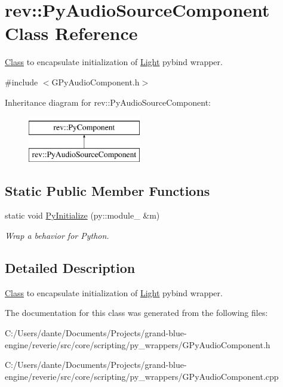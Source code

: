 \hypertarget{classrev_1_1_py_audio_source_component}{}\section{rev\+::Py\+Audio\+Source\+Component Class Reference}
\label{classrev_1_1_py_audio_source_component}


\mbox{\hyperlink{struct_class}{Class}} to encapsulate initialization of \mbox{\hyperlink{classrev_1_1_light}{Light}} pybind wrapper.  




{\ttfamily \#include $<$G\+Py\+Audio\+Component.\+h$>$}

Inheritance diagram for rev\+::Py\+Audio\+Source\+Component\+:\begin{figure}[H]
\begin{center}
\leavevmode
\includegraphics[height=2.000000cm]{classrev_1_1_py_audio_source_component}
\end{center}
\end{figure}
\subsection*{Static Public Member Functions}
\begin{DoxyCompactItemize}
\item 
\mbox{\label{classrev_1_1_py_audio_source_component_a4972bb4e03217925d9008727a3e3cdab}} 
static void \mbox{\hyperlink{classrev_1_1_py_audio_source_component_a4972bb4e03217925d9008727a3e3cdab}{Py\+Initialize}} (py\+::module\+\_\+ \&m)
\begin{DoxyCompactList}\small\item\em Wrap a behavior for Python. \end{DoxyCompactList}\end{DoxyCompactItemize}


\subsection{Detailed Description}
\mbox{\hyperlink{struct_class}{Class}} to encapsulate initialization of \mbox{\hyperlink{classrev_1_1_light}{Light}} pybind wrapper. 

The documentation for this class was generated from the following files\+:\begin{DoxyCompactItemize}
\item 
C\+:/\+Users/dante/\+Documents/\+Projects/grand-\/blue-\/engine/reverie/src/core/scripting/py\+\_\+wrappers/G\+Py\+Audio\+Component.\+h\item 
C\+:/\+Users/dante/\+Documents/\+Projects/grand-\/blue-\/engine/reverie/src/core/scripting/py\+\_\+wrappers/G\+Py\+Audio\+Component.\+cpp\end{DoxyCompactItemize}
